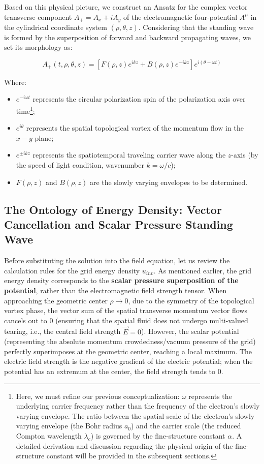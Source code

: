 \documentclass[12pt, a4paper]{article}
\begin{document}
Based on this physical picture, we construct an Ansatz for the complex vector transverse component $A_+ = A_x + iA_y$ of the electromagnetic four-potential $A^\mu$ in the cylindrical coordinate system $(\rho, \theta, z)$. Considering that the standing wave is formed by the superposition of forward and backward propagating waves, we set its morphology as:

\begin{equation}
A_+(t, \rho, \theta, z) = \left[ F(\rho, z) e^{ikz} + B(\rho, z) e^{-ikz} \right] e^{i(\theta - \omega t)} 
\end{equation}

Where:
\begin{itemize}
    \item $e^{-i\omega t}$ represents the circular polarization spin of the polarization axis over time\footnote{Here, we must refine our previous conceptualization: $\omega$ represents the underlying carrier frequency rather than the frequency of the electron's slowly varying envelope. The ratio between the spatial scale of the electron's slowly varying envelope (the Bohr radius $a_0$) and the carrier scale (the reduced Compton wavelength $\lambda_c$) is governed by the fine-structure constant $\alpha$. A detailed derivation and discussion regarding the physical origin of the fine-structure constant will be provided in the subsequent sections.};
    \item $e^{i\theta}$ represents the spatial topological vortex of the momentum flow in the $x-y$ plane;
    \item $e^{\pm ikz}$ represents the spatiotemporal traveling carrier wave along the $z$-axis (by the speed of light condition, wavenumber $k = \omega/c$);
    \item $F(\rho, z)$ and $B(\rho, z)$ are the slowly varying envelopes to be determined.
\end{itemize}


\subsection{The Ontology of Energy Density: Vector Cancellation and Scalar Pressure Standing Wave}

Before substituting the solution into the field equation, let us review the calculation rules for the grid energy density $u_{inv}$. As mentioned earlier, the grid energy density corresponds to the \textbf{scalar pressure superposition of the potential}, rather than the electromagnetic field strength tensor. When approaching the geometric center $\rho \to 0$, due to the symmetry of the topological vortex phase, the vector sum of the spatial transverse momentum vector flows cancels out to 0 (ensuring that the spatial fluid does not undergo multi-valued tearing, i.e., the central field strength $\vec{E}=0$). However, the scalar potential (representing the absolute momentum crowdedness/vacuum pressure of the grid) perfectly superimposes at the geometric center, reaching a local maximum. The electric field strength is the negative gradient of the electric potential; when the potential has an extremum at the center, the field strength tends to 0.
\end{document}

